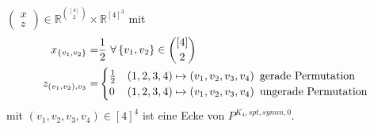 \documentclass[10p,a4paper,BCOR = 12mm, DIV=15]{scrbook}
\begin{document}
\begin{Le}
\label{le:ecke_P_p^4,symm,0_1}
$\left(
\begin{array}{c}
x \\
z
\end{array}
\right)\in \mathbb{R}^{[4]\choose 2}\times \mathbb{R}^{[4]^{\underline{3}}}$ mit
\begin{align*}
x_{\left\{v_1, v_2\right\}} = & \frac{1}{2}\ \forall \left\{v_1, v_2\right\}\in {[4]\choose 2} \\
z_{\left(v_1, v_2\right), v_3} = & \begin{cases}
\frac{1}{2} & \left(1, 2, 3, 4\right) \mapsto \left(v_1, v_2, v_3, v_4\right)\textnormal{ gerade Permutation} \\
0 & \left(1, 2, 3, 4\right) \mapsto \left(v_1, v_2, v_3, v_4\right)\textnormal{ ungerade Permutation}
\end{cases}
\end{align*}
mit $\left(v_1, v_2, v_3, v_4\right) \in \left[4\right]^{\underline{4}}$ ist eine Ecke von $P^{K_4, spt, symm, 0}$.
\end{Le}
\end{document}
